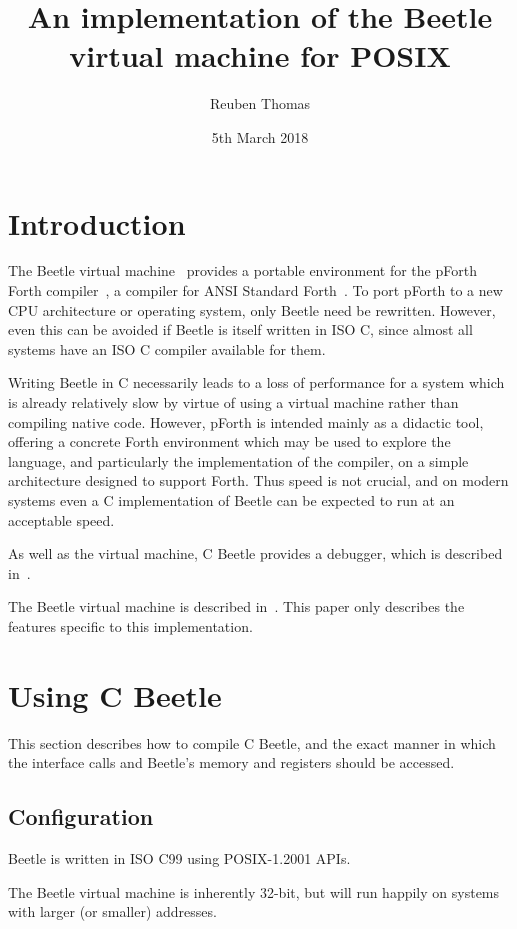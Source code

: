 \documentclass[english]{article}
\title{An implementation of the Beetle virtual machine for POSIX}
\author{Reuben Thomas}
\date{5th March 2018}
\begin{document}
\maketitle


\section{Introduction}

The Beetle virtual machine~\cite{beetle} provides a portable environment
for the pForth Forth compiler~\cite{beetledis}, a compiler for ANSI Standard
Forth~\cite{ANSIforth}. To port pForth to a new CPU architecture or operating system, only Beetle need be rewritten. However, even this can be
avoided if Beetle is itself written in ISO C, since almost all systems have
an ISO C compiler available for them.

Writing Beetle in C necessarily leads to a loss of performance for a system
which is already relatively slow by virtue of using a virtual machine
rather than compiling native code. However, pForth is intended mainly as a
didactic tool, offering a concrete Forth environment which may be used to
explore the language, and particularly the implementation of the compiler, on
a simple architecture designed to support Forth. Thus speed is not crucial,
and on modern systems even a C implementation of Beetle can be expected to
run at an acceptable speed.

As well as the virtual machine, C Beetle provides a debugger, which is described in~\cite{beetleuiface}.

The Beetle virtual machine is described in~\cite{beetle}. This paper only
describes the features specific to this implementation.


\section{Using C Beetle}

This section describes how to compile C Beetle, and the exact manner in which
the interface calls and Beetle's memory and registers should be accessed.


\subsection{Configuration}
\label{configuration}

Beetle is written in ISO C99 using POSIX-1.2001 APIs.

The Beetle virtual machine is inherently 32-bit, but will run happily on systems with larger (or smaller) addresses.
\end{document}
